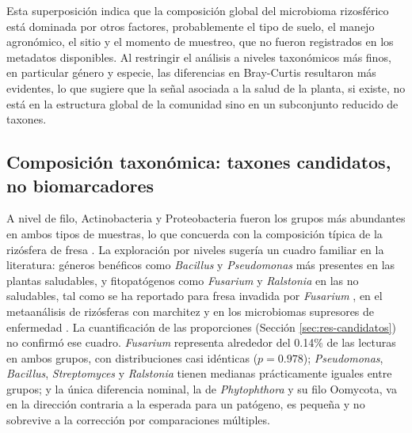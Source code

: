 Esta superposición indica que la composición global del microbioma rizosférico está dominada por
otros factores, probablemente el tipo de suelo, el manejo agronómico, el sitio y el momento de
muestreo, que no fueron registrados en los metadatos disponibles. Al restringir el análisis a
niveles taxonómicos más finos, en particular género y especie, las diferencias en Bray-Curtis
resultaron más evidentes, lo que sugiere que la señal asociada a la salud de la planta, si existe,
no está en la estructura global de la comunidad sino en un subconjunto reducido de taxones.

\subsection{Composición taxonómica: taxones candidatos, no biomarcadores}

A nivel de filo, Actinobacteria y Proteobacteria fueron los grupos más abundantes en ambos tipos de
muestras, lo que concuerda con la composición típica de la rizósfera de fresa
\citep{yang2020comparison, xiong2020rhizosphere}. La exploración por niveles sugería un cuadro
familiar en la literatura: géneros benéficos como \textit{Bacillus} y \textit{Pseudomonas} más
presentes en las plantas saludables, y fitopatógenos como \textit{Fusarium} y \textit{Ralstonia} en
las no saludables, tal como se ha reportado para fresa invadida por \textit{Fusarium}
\citep{yang2023fusarium}, en el metaanálisis de rizósferas con marchitez \citep{su2025general} y en
los microbiomas supresores de enfermedad \citep{spooren2024plant}. La cuantificación de las
proporciones (Sección \ref{sec:res-candidatos}) no confirmó ese cuadro. \textit{Fusarium} representa alrededor del 0.14\%
de las lecturas en ambos grupos, con distribuciones casi idénticas ($p = 0.978$); \textit{Pseudomonas},
\textit{Bacillus}, \textit{Streptomyces} y \textit{Ralstonia} tienen medianas prácticamente iguales entre
grupos; y la única diferencia nominal, la de \textit{Phytophthora} y su filo Oomycota, va en la
dirección contraria a la esperada para un patógeno, es pequeña y no sobrevive a la corrección por
comparaciones múltiples.

